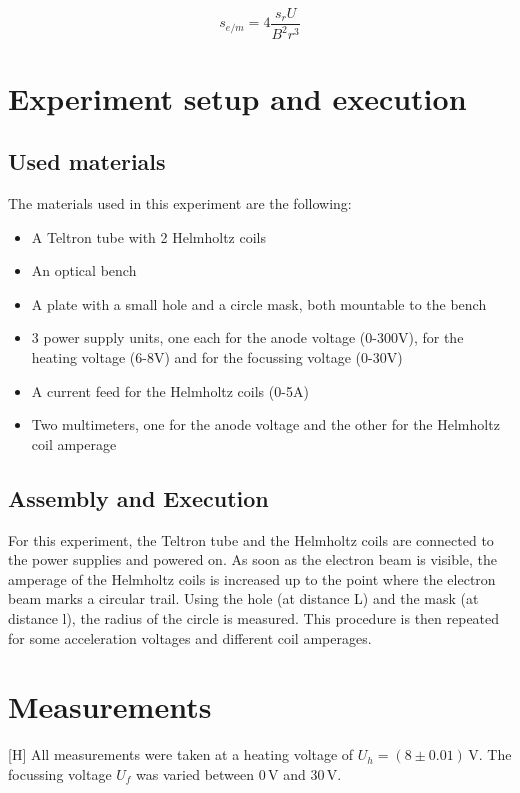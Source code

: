 \documentclass{scrreprt}
\newcommand{\unit}[1]{\ensuremath{\, \mathrm{#1}}}
\begin{document}
\begin{equation}
s_{e/m} = 4 \frac{s_r U}{B^2 r^3}
\end{equation}

\section{Experiment setup and execution}

\subsection{Used materials}
The materials used in this experiment are the following:
\begin{itemize}
\item A Teltron tube with 2 Helmholtz coils
\item An optical bench
\item A plate with a small hole and a circle mask, both mountable to the bench
\item 3 power supply units, one each for the anode voltage (0-300V), for the heating voltage (6-8V) and for the focussing voltage (0-30V)
\item A current feed for the Helmholtz coils (0-5A)
\item Two multimeters, one for the anode voltage and the other for the Helmholtz coil amperage
\end{itemize}

\subsection{Assembly and Execution}
For this experiment, the Teltron tube and the Helmholtz coils are connected to the power supplies and powered on. As soon as the electron beam is visible, the amperage of the Helmholtz coils is increased up to the point where the electron beam marks a circular trail. Using the hole (at distance L) and the mask (at distance l), the radius of the circle is measured. This procedure is then repeated for some acceleration voltages and different coil amperages.

\newpage
\section{Measurements}[H]
All measurements were taken at a heating voltage of $U_h = (8 \pm 0.01) \unit{V}$. The focussing voltage $U_f$ was varied between $0 \unit{V}$ and $30 \unit{V}$.
\end{document}
